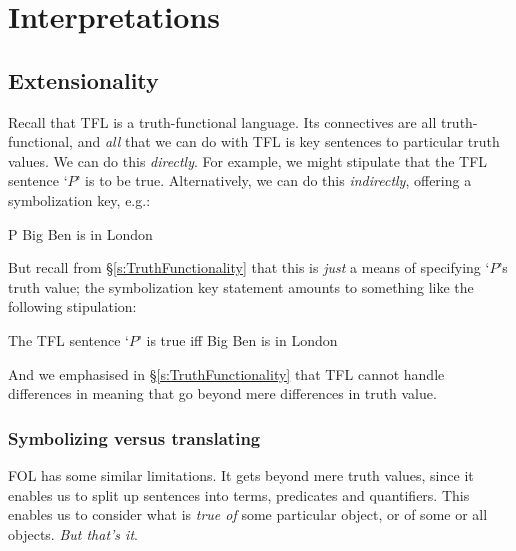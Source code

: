 \part{Interpretations}
\label{ch.semantics}


\chapter{Extensionality}\label{s:Interpretations}

Recall that TFL is a truth-functional language. Its connectives are all truth-functional, and \emph{all} that we can do with TFL is key sentences to particular truth values. We can do this \emph{directly}. For example, we might stipulate that the TFL sentence `$P$' is to be true. Alternatively, we can do this \emph{indirectly}, offering a symbolization key, e.g.:
	\begin{ekey}
		\item[P] Big Ben is in London
	\end{ekey}
 But recall from \S\ref{s:TruthFunctionality} that this is \emph{just} a means of specifying `$P$'s truth value; the symbolization key statement amounts to something like the following stipulation: 
	\begin{ebullet}
		\item The TFL sentence `$P$' is true iff Big Ben is in London
	\end{ebullet}
And we emphasised in \S\ref{s:TruthFunctionality} that TFL cannot handle differences in meaning that go beyond mere differences in truth value.

\section{Symbolizing versus translating}

FOL has some similar limitations. It gets beyond mere truth values, since it enables us to split up sentences into terms, predicates and quantifiers. This enables us to consider what is \emph{true of} some particular object, or of some or all objects. \emph{But that's it}.

